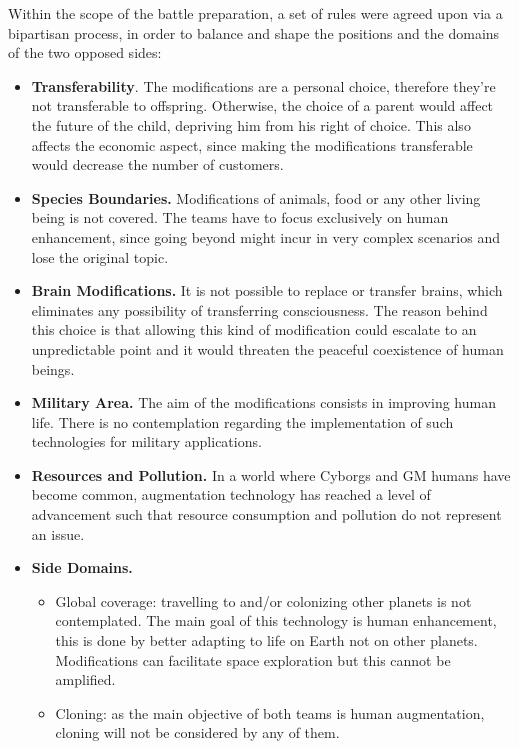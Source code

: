 Within the scope of the battle preparation, a set of rules were agreed upon via a bipartisan process, in order to balance and shape the positions and the domains of the two opposed sides:\\
\begin{itemize}
    \item \textbf{Transferability}. The modifications are a personal choice, therefore they’re not transferable to offspring. Otherwise, the choice of a parent would affect the future of the child, depriving him from his right of choice. This also affects the economic aspect, since making the modifications transferable would decrease the number of customers. 
    \item \textbf{Species Boundaries.} Modifications of animals, food or any other living being is not covered. The teams have to focus exclusively on human enhancement, since going beyond might incur in very complex scenarios and lose the original topic.
    \item \textbf{Brain Modifications.} It is not possible to replace or transfer brains, which eliminates any possibility of transferring consciousness. The reason behind this choice is that allowing this kind of modification could escalate to an unpredictable point and it would threaten the peaceful coexistence of human beings.
    \item \textbf{Military Area.} The aim of the modifications consists in improving human life. There is no contemplation regarding the implementation of such technologies for military applications.
    \item \textbf{Resources and Pollution.} In a world where Cyborgs and GM humans have become common, augmentation technology has reached a level of advancement such that resource consumption and pollution do not represent an issue.
    \item \textbf{Side Domains.}  
        \begin{itemize}
            \item Global coverage: travelling to and/or colonizing other planets is not contemplated. The main goal of this technology is human enhancement, this is done by better adapting to life on Earth not on other planets. Modifications can facilitate space exploration but this cannot be amplified. 
            \item Cloning: as the main objective of both teams is human augmentation, cloning will not be considered by any of them.
        \end{itemize}
\end{itemize}







